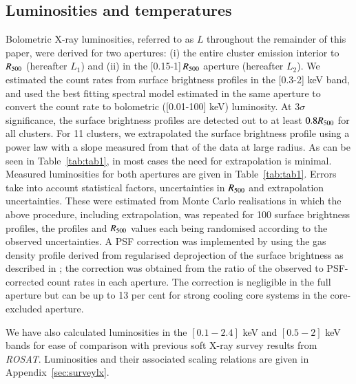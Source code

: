 \documentclass[oldversion]{aa}
\begin{document}
{%

\subsection{Luminosities and temperatures}
\label{sec:lumin}

Bolometric X-ray luminosities, referred to as $L$ throughout the remainder of this paper, were derived for two apertures: (i) the entire
cluster emission interior to $R_{500}$ (hereafter $L_1$) and (ii) in the [0.15-1]\,$R_{500}$
aperture (hereafter $L_2$). We estimated the count rates from surface brightness
profiles in the [0.3-2] keV band, and used the best fitting spectral
model estimated in the same aperture to convert the count rate to
bolometric ([0.01-100] keV) luminosity. At $3\sigma$ significance, the
surface brightness profiles are detected out to at least $0.8R_{500}$ for
all clusters. For 11 clusters, we extrapolated the surface brightness
profile using a power law with a slope measured from that of the data
at large radius. As can be seen in Table~\ref{tab:tab1}, in most cases
the need for extrapolation is minimal. Measured luminosities for both
apertures are given in Table~\ref{tab:tab1}. Errors take into account
statistical factors, uncertainties in $R_{500}$ and extrapolation uncertainties. These were estimated from Monte Carlo realisations in which the above procedure, including extrapolation,
was repeated for 100 surface brightness profiles, the profiles and
$R_{500}$ values each being randomised according to the observed
uncertainties. A PSF correction was implemented by using the gas density profile derived from regularised deprojection of the surface brightness as described in 
\cite{croston06}; the correction was obtained from the ratio of the observed to PSF-corrected count rates in each aperture. The correction is negligible in the full aperture but can be up to 13 per cent for strong cooling core systems in the core-excluded aperture. 

We have also calculated luminosities in the $[0.1-2.4]$ keV and $[0.5-2]$ keV bands for ease of comparison with previous soft X-ray survey results from {\it ROSAT}. Luminosities and their associated scaling relations are given in Appendix~\ref{sec:surveylx}.

}
\end{document}
